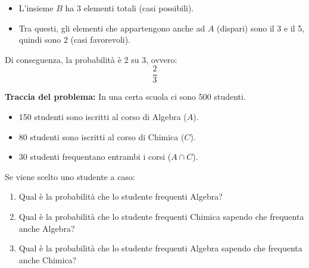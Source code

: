 \begin{esempio}
\begin{itemize}
    \item L'insieme $B$ ha 3 elementi totali (casi possibili).
    \item Tra questi, gli elementi che appartengono anche ad $A$ (dispari) sono il 3 e il 5, quindi sono 2 (casi favorevoli).
\end{itemize}

Di conseguenza, la probabilità è 2 su 3, ovvero:
\[
\frac{2}{3}
\]

\end{esempio}

\begin{esempio}

\textbf{Traccia del problema:}
In una certa scuola ci sono 500 studenti. 
\begin{itemize}
    \item 150 studenti sono iscritti al corso di Algebra ($A$).
    \item 80 studenti sono iscritti al corso di Chimica ($C$).
    \item 30 studenti frequentano entrambi i corsi ($A \cap C$).
\end{itemize}
Se viene scelto uno studente a caso:
\begin{enumerate}
    \item[(a)] Qual è la probabilità che lo studente frequenti Algebra?
    \item[(b)] Qual è la probabilità che lo studente frequenti Chimica sapendo che frequenta anche Algebra?
    \item[(c)] Qual è la probabilità che lo studente frequenti Algebra sapendo che frequenta anche Chimica?
\end{enumerate}

\begin{center}
\end{center}
\end{esempio}
